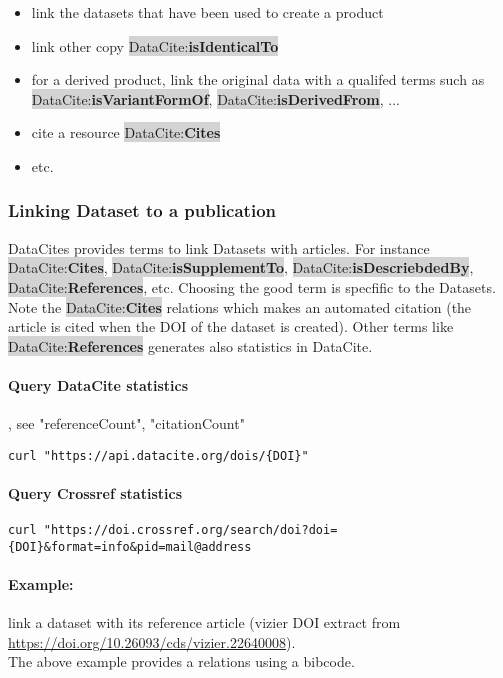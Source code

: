 \documentclass[11pt,a4paper]{ivoa}
\newcommand{\dataciteterm}[1]{\colorbox{lightgray}{DataCite:\textbf{#1}}}
\begin{document}
\begin{itemize}
	\item link the datasets that have been used to create a product 
	\item link other copy \dataciteterm{isIdenticalTo}
	\item for a derived product, link the original data with a qualifed terms such as \dataciteterm{isVariantFormOf}, \dataciteterm{isDerivedFrom}, ...
	\item cite a resource \dataciteterm{Cites}
	\item etc.
\end{itemize}



\subsubsection{Linking Dataset to a publication}
DataCites provides terms to link Datasets with articles. For instance \dataciteterm{Cites}, \dataciteterm{isSupplementTo}, \dataciteterm{isDescriebdedBy}, \dataciteterm{References}, etc.
Choosing the good term is specfific to the Datasets. \\


Note the \dataciteterm{Cites} relations which makes an automated citation (the article is cited when the DOI of the dataset is created). 
Other terms like \dataciteterm{References} generates also statistics in DataCite.


\paragraph{Query DataCite statistics}, see "referenceCount", "citationCount"
\begin{verbatim}
curl "https://api.datacite.org/dois/{DOI}"	
\end{verbatim}


\paragraph{Query Crossref statistics}
\begin{verbatim}
curl "https://doi.crossref.org/search/doi?doi={DOI}&format=info&pid=mail@address	
\end{verbatim}


\paragraph{Example:} link a dataset with its reference article (vizier DOI extract from \url{https://doi.org/10.26093/cds/vizier.22640008}).\\
The above example provides a relations using a bibcode.
\end{document}
